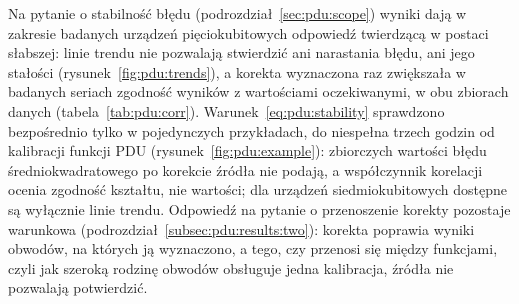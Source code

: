 Na pytanie o stabilność błędu (podrozdział~\ref{sec:pdu:scope}) wyniki dają w zakresie badanych urządzeń pięciokubitowych odpowiedź twierdzącą w postaci słabszej: linie trendu nie pozwalają stwierdzić ani narastania błędu, ani jego stałości (rysunek~\ref{fig:pdu:trends}), a korekta wyznaczona raz zwiększała w badanych seriach zgodność wyników z wartościami oczekiwanymi, w obu zbiorach danych (tabela~\ref{tab:pdu:corr}).
Warunek~\eqref{eq:pdu:stability} sprawdzono bezpośrednio tylko w pojedynczych przykładach, do niespełna trzech godzin od kalibracji funkcji PDU (rysunek~\ref{fig:pdu:example}): zbiorczych wartości błędu średniokwadratowego po korekcie źródła nie podają, a współczynnik korelacji ocenia zgodność kształtu, nie wartości; dla urządzeń siedmiokubitowych dostępne są wyłącznie linie trendu.
Odpowiedź na pytanie o przenoszenie korekty pozostaje warunkowa (podrozdział~\ref{subsec:pdu:results:two}): korekta poprawia wyniki obwodów, na których ją wyznaczono, a tego, czy przenosi się między funkcjami, czyli jak szeroką rodzinę obwodów obsługuje jedna kalibracja, źródła nie pozwalają potwierdzić.

